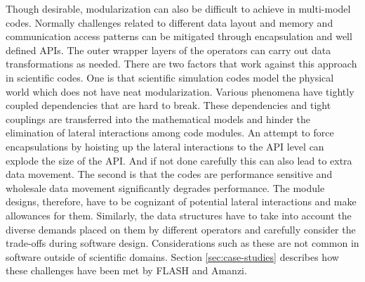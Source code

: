 Though desirable, modularization can also be difficult to achieve in
multi-model codes. Normally challenges related to different data
layout and memory and communication access patterns 
can be mitigated through encapsulation and well defined APIs. The outer
wrapper layers of the operators can carry out data transformations as
needed. There are two factors that work against this approach in scientific
codes. One is that scientific simulation codes model the physical world which does not
have neat modularization. Various phenomena have tightly coupled
dependencies that are hard to break. These dependencies and tight
couplings are transferred into the mathematical models and hinder the
elimination of lateral interactions among code modules. An attempt to
force encapsulations by hoisting up the lateral interactions to the
API level can explode the size of the API. And if not done carefully
this can also lead to extra data movement. The second is that 
the codes are performance sensitive and wholesale data movement
significantly degrades performance. 
The module designs,
therefore, have to be cognizant of potential lateral interactions and
make allowances for them. Similarly, the data structures have to take
into account the diverse demands placed on them by different operators
and carefully consider the trade-offs during software
design. Considerations such as these are not common in software
outside of scientific domains.   
Section \ref{sec:case-studies} describes how these challenges have
been met by FLASH and Amanzi.




